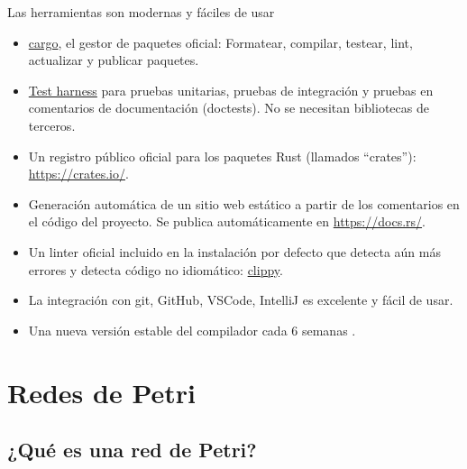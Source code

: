 \documentclass{beamer}
\begin{document}
\begin{frame}{Las herramientas son modernas y fáciles de usar}
  \begin{itemize}
    \item \href{https://doc.rust-lang.org/stable/cargo/}{cargo},
          el gestor de paquetes oficial: Formatear, compilar, testear, lint, actualizar y publicar paquetes.
    \item \href{https://doc.rust-lang.org/book/ch11-00-testing.html}{Test harness}
          para pruebas unitarias, pruebas de integración y pruebas en comentarios de documentación (doctests).
          No se necesitan bibliotecas de terceros.
    \item Un registro público oficial para los paquetes Rust (llamados ``crates''): \url{https://crates.io/}.
    \item Generación automática de un sitio web estático a partir de los comentarios en el código del proyecto.
          Se publica automáticamente en \url{https://docs.rs/}.
    \item Un linter oficial incluido en la instalación por defecto que detecta aún más errores
          y detecta código no idiomático: \href{https://github.com/rust-lang/rust-clippy}{clippy}.
    \item La integración con git, GitHub, VSCode, IntelliJ es excelente y fácil de usar.
    \item Una nueva versión estable del compilador cada 6 semanas \cite{albini2019}.
  \end{itemize}
\end{frame}

\section{Redes de Petri}

\subsection{¿Qué es una red de Petri?}
\end{document}
